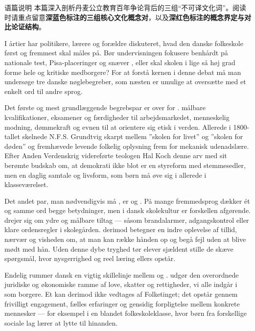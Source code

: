 \begin{tipbox}{语篇说明}
本篇深入剖析丹麦公立教育百年争论背后的三组“不可译文化词”。阅读时请重点留意\textbf{\color{NCDNavy}深蓝色标注的三组核心文化概念对}，以及\textbf{\color{NCDRed}深红色标注的概念界定与对比论证结构}。
\end{tipbox}

I årtier har politikere, lærere og forældre diskuteret, hvad den danske folkeskole først og fremmest skal måles på. Bør undervisningen fokusere benhårdt på nationale test, Pisa-placeringer og snæver , eller skal skolen i lige så høj grad forme hele og kritiske medborgere? For at forstå kernen i denne debat må man undersøge tre danske nøglebegreber, som næsten er umulige at oversætte med et enkelt ord til andre sprog.

Det første og mest grundlæggende begrebspar er  over for .    målbare kvalifikationer, eksamener og færdigheder til arbejdsmarkedet,    menneskelig modning, dømmekraft og evnen til at orientere sig etisk i verden. Allerede i 1800-tallet skelnede N.F.S. Grundtvig skarpt mellem ”skolen for livet” og ”skolen for døden” og fremhævede levende folkelig oplysning frem for mekanisk udenadslære. Efter Anden Verdenskrig videreførte teologen Hal Koch denne arv med sit berømte budskab om, at demokrati ikke blot er en styreform med stemmesedler, men en daglig samtale og livsform, som børn må øve sig i allerede i klasseværelset.

Det andet par, man nødvendigvis må , er  og . På mange fremmedsprog dækker ét og samme ord begge betydninger, men i dansk skolekultur er forskellen afgørende.  drejer sig om ydre og målbare tiltag --- såsom brandalarmer, adgangskontrol eller klare ordensregler i skolegården.  derimod betegner en indre oplevelse af tillid, nærvær og visheden om, at man kan række hånden op og begå fejl uden at blive mødt med hån. Uden denne dybe tryghed tør elever sjældent stille de skæve spørgsmål, hvor nysgerrighed og reel læring ellers opstår.

Endelig rummer dansk en vigtig skillelinje mellem  og .  udgør den overordnede juridiske og økonomiske ramme af love, skatter og rettigheder, vi alle indgår i som borgere. Et  kan derimod ikke vedtages af Folketinget; det opstår gennem frivilligt engagement, fælles erfaringer og gensidig forpligtelse mellem konkrete mennesker --- for eksempel i en blandet folkeskoleklasse, hvor børn fra forskellige sociale lag lærer at lytte til hinanden.

